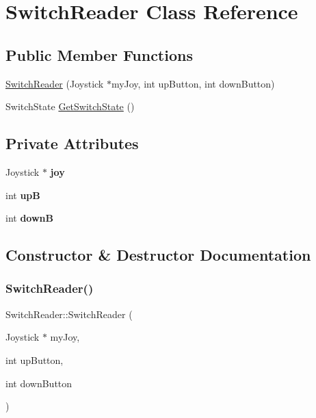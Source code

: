 \hypertarget{class_switch_reader}{}\section{Switch\+Reader Class Reference}
\label{class_switch_reader}
\subsection*{Public Member Functions}
\begin{DoxyCompactItemize}
\item 
\hyperlink{class_switch_reader_ae30fd88c0bb80f04a0994bd6ca9a8e25}{Switch\+Reader} (Joystick $\ast$my\+Joy, int up\+Button, int down\+Button)
\item 
Switch\+State \hyperlink{class_switch_reader_a5e5ce06172f054194d20c79941c860da}{Get\+Switch\+State} ()
\end{DoxyCompactItemize}
\subsection*{Private Attributes}
\begin{DoxyCompactItemize}
\item 
\mbox{\label{class_switch_reader_a7bec529bd7fcb3415502ba6d3455453f}} 
Joystick $\ast$ {\bfseries joy}
\item 
\mbox{\label{class_switch_reader_a5c64b3e5505563f085f091a9e720e126}} 
int {\bfseries upB}
\item 
\mbox{\label{class_switch_reader_a8f8be0ecc7a2ffa154532c454177ec78}} 
int {\bfseries downB}
\end{DoxyCompactItemize}


\subsection{Constructor \& Destructor Documentation}
\mbox{\label{class_switch_reader_ae30fd88c0bb80f04a0994bd6ca9a8e25}} 
\subsubsection{\texorpdfstring{Switch\+Reader()}{SwitchReader()}}
{\footnotesize\ttfamily Switch\+Reader\+::\+Switch\+Reader (\begin{DoxyParamCaption}\item[{Joystick $\ast$}]{my\+Joy,  }\item[{int}]{up\+Button,  }\item[{int}]{down\+Button }\end{DoxyParamCaption})}

